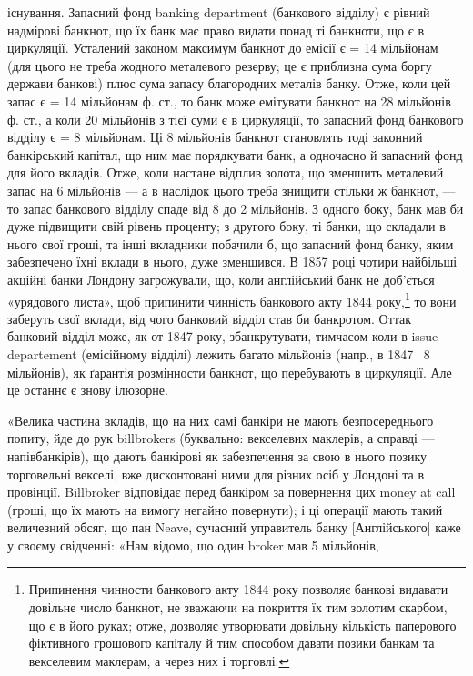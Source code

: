 існування. Запасний фонд banking department (банкового відділу) є рівний
надмірові банкнот, що їх банк має право видати понад ті банкноти, що є в
циркуляції. Усталений законом максимум банкнот до емісії є = 14 мільйонам
(для цього не треба жодного металевого резерву; це є приблизна сума боргу
держави банкові) плюс сума запасу благородних металів банку. Отже, коли цей запас
є = 14 мільйонам ф. ст., то банк може емітувати банкнот на 28 мільйонів ф. ст.,
а коли 20 мільйонів з тієї суми є в циркуляції, то запасний фонд банкового відділу
є = 8 мільйонам. Ці 8 мільйонів банкнот становлять тоді законний банкірський
капітал, що ним має порядкувати банк, а одночасно й запасний фонд для його
вкладів. Отже, коли настане відплив золота, що зменшить металевий запас на
6 мільйонів — а в наслідок цього треба знищити стільки ж банкнот, — то запас
банкового відділу спаде від 8 до 2 мільйонів. З одного боку, банк мав би дуже
підвищити свій рівень проценту; з другого боку, ті банки, що складали в нього
свої гроші, та інші вкладники побачили б, що запасний фонд банку, яким забезпечено
їхні вклади в нього, дуже зменшився. В 1857 році чотири найбільші
акційні банки Лондону загрожували, що, коли англійський банк не доб’ється «урядового листа», щоб
припинити чинність банкового акту 1844 року,\footnote{Припинення чинности банкового акту 1844 року позволяє банкові видавати довільне число банкнот, не
зважаючи на покриття їх тим золотим скарбом, що є в його руках; отже, дозволяє утворювати довільну
кількість паперового фіктивного грошового капіталу й тим способом давати позики банкам та векселевим
маклерам, а через них і торговлі.} то вони
заберуть свої вклади, від чого банковий відділ став би банкротом. Оттак банковий
відділ може, як от 1847 року, збанкрутувати, тимчасом коли в issue departement
(емісійному відділі) лежить багато мільйонів (напр., в 1847~ 8 мільйонів),
як ґарантія розмінности банкнот, що перебувають в циркуляції. Але це
останнє є знову ілюзорне.

«Велика частина вкладів, що на них самі банкіри не мають безпосереднього
попиту, йде до рук billbrokers (буквально: векселевих маклерів, а справді —
напівбанкірів), що дають банкірові як забезпечення за свою в нього позику
торговельні векселі, вже дисконтовані ними для різних осіб у Лондоні та в
провінції. Billbroker відповідає перед банкіром за повернення цих money at
call (гроші, що їх мають на вимогу негайно повернути); і ці операції мають
такий величезний обсяг, що пан Neave, сучасний управитель банку [Англійського]
каже у своєму свідченні: «Нам відомо, що один broker мав 5 мільйонів,
\parbreak{}  %
